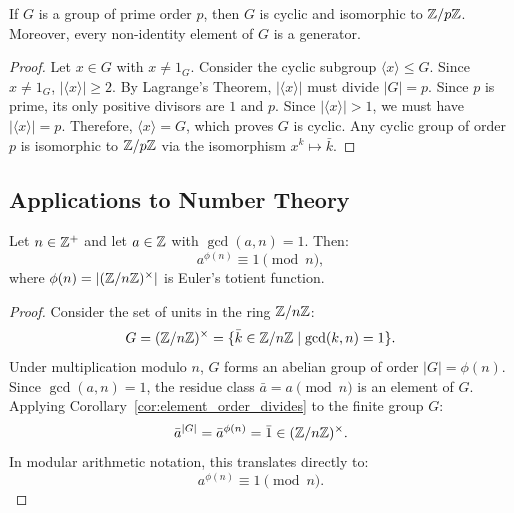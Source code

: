\begin{corollary}
\label{cor:prime_order_cyclic}
If $G$ is a group of prime order $p$, then $G$ is cyclic and isomorphic to $\mathbb{Z}/p\mathbb{Z}$. Moreover, every non-identity element of $G$ is a generator.
\end{corollary}

\begin{proof}
Let $x \in G$ with $x \ne 1_G$. Consider the cyclic subgroup $\langle x \rangle \le G$.
Since $x \ne 1_G$, $|\langle x \rangle| \ge 2$.
By Lagrange's Theorem, $|\langle x \rangle|$ must divide $|G| = p$.
Since $p$ is prime, its only positive divisors are $1$ and $p$.
Since $|\langle x \rangle| > 1$, we must have $|\langle x \rangle| = p$.
Therefore, $\langle x \rangle = G$, which proves $G$ is cyclic.
Any cyclic group of order $p$ is isomorphic to $\mathbb{Z}/p\mathbb{Z}$ via the isomorphism $x^k \mapsto \bar{k}$.
\end{proof}

\subsection{Applications to Number Theory}

\begin{theorem}
\label{thm:euler_totient}
Let $n \in \mathbb{Z}^+$ and let $a \in \mathbb{Z}$ with $\gcd(a, n) = 1$. Then:
\begin{equation}
a^{\phi(n)} \equiv 1 \pmod n,
\end{equation}
where $\phi(n) = |(\mathbb{Z}/n\mathbb{Z})^\times|$ is Euler's totient function.
\end{theorem}

\begin{proof}
Consider the set of units in the ring $\mathbb{Z}/n\mathbb{Z}$:
\begin{equation*}
G = (\mathbb{Z}/n\mathbb{Z})^\times = \{ \bar{k} \in \mathbb{Z}/n\mathbb{Z} \mid \gcd(k, n) = 1 \}.
\end{equation*}
Under multiplication modulo $n$, $G$ forms an abelian group of order $|G| = \phi(n)$.
Since $\gcd(a, n) = 1$, the residue class $\bar{a} = a \pmod n$ is an element of $G$.
Applying Corollary~\ref{cor:element_order_divides} to the finite group $G$:
\begin{equation*}
\bar{a}^{|G|} = \bar{a}^{\phi(n)} = \bar{1} \in (\mathbb{Z}/n\mathbb{Z})^\times.
\end{equation*}
In modular arithmetic notation, this translates directly to:
\begin{equation*}
a^{\phi(n)} \equiv 1 \pmod n.
\end{equation*}
\end{proof}


